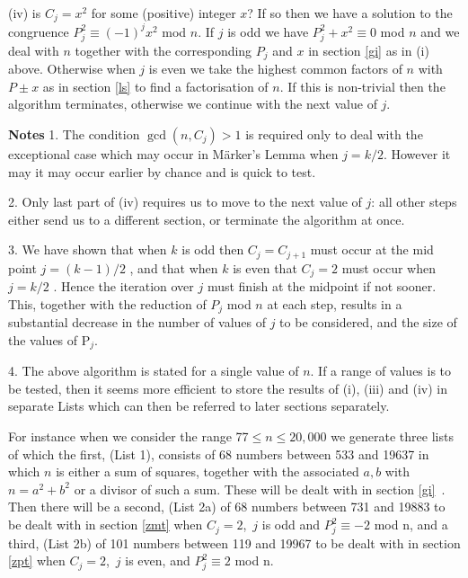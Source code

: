 \documentclass[12pt]{article}
\begin{document}
\qquad (iv) is $C_{j}=x^{2}$ for some (positive) integer $x$? If so then we
have a solution to the congruence $P_{j}^{2}\equiv (-1)^{j}x^{2}$ mod $n.$
If $j$ is odd we have $P_{j}^{2}+x^{2}\equiv 0$ mod $n$ and we deal with $n$
together with the corresponding $P_{j}$ and $x$ in section \ref{gi} as in
(i) above. Otherwise when $j$ is even we take the highest common factors of $%
n$ with $P\pm x$ as in section \ref{ls} to find a factorisation of $n.$ If
this is non-trivial then the algorithm terminates, otherwise we continue
with the next value of $j.$

\qquad

\textbf{Notes} 1. The condition $\gcd \left( n,C_{j}\right) >1$ is required
only to deal with the exceptional case which may occur in M\"{a}rker's Lemma
when $j=k/2.$ However it may it may occur earlier by chance and is quick to
test.

2. Only last part of (iv) requires us to move to the next value of $j$: all
other steps either send us to a different section, or terminate the
algorithm at once.

3. We have shown that when $k$ is odd then $C_{j}=C_{j+1}$ must occur at the
mid point $j=\left( k-1\right) /2$ , and that when $k$ is even that $C_{j}=2$
must occur when $j=k/2$ . Hence the iteration over $j$ must finish at the
midpoint if not sooner. This, together with the reduction of $P_{j}$ mod $n$
at each step, results in a substantial decrease in the number of values of $%
j $ to be considered, and the size of the values of P$_{j}$.

4. The above algorithm is stated for a single value of $n.$ If a range of
values is to be tested, then it seems more efficient to store the results of
(i), (iii) and (iv) in separate Lists which can then be referred to later
sections separately.

For instance when we consider the range 77$\leq n\leq 20,000$ we generate
three lists of which the first, (List 1), consists of 68 numbers between 533
and 19637 in which $n$ is either a sum of squares, together with the
associated $a,b$ with $n=a^{2}+b^{2}$ or a divisor of such a sum. These will
be dealt with in section \ref{gi}\ . Then there will be a second, (List 2a)
of 68 numbers between 731 and 19883 to be dealt with in section \ref{zmt}
when $C_{j}=2$,\thinspace\ $j$ is odd and $P_{j}^{2}\equiv -2$ mod n, and a
third, (List 2b) of 101 numbers between 119 and 19967 to be dealt with in
section \ref{zpt} when $C_{j}=2$,\thinspace\ $j$ is even, and $%
P_{j}^{2}\equiv 2$ mod n.
\end{document}

